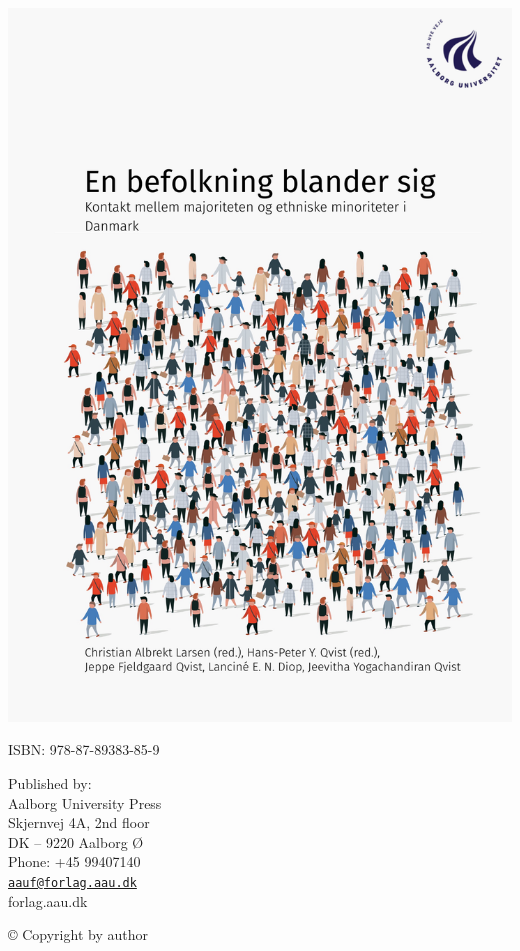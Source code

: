 \documentclass[
]{book}
\subtitle{\emph{Danskernes og indvandrernes kontakt i familier og på skoler og arbejdspladser}}
\author{Christian Albrekt Larsen (red.) \and Jeppe Fjeldgaard Qvist \and Hans-Peter Y. Qvist (red.) \and Lanciné Diop-Christensen \and Jeevitha Yogachandiran Qvist}
\date{2025-01-10 20:15:07}
\begin{document}
\thispagestyle{empty} %
\includegraphics[width=\paperwidth,height=\paperheight]{images/00-forside.pdf} %
\restoregeometry %
\clearpage

\pagestyle{empty}

ISBN: 978-87-89383-85-9

Published by:\\
Aalborg University Press\\
Skjernvej 4A, 2nd floor\\
DK -- 9220 Aalborg Ø\\
Phone: +45 99407140\\
\href{mailto:aauf@forlag.aau.dk}{\nolinkurl{aauf@forlag.aau.dk}}\\
forlag.aau.dk

© Copyright by author
\end{document}
